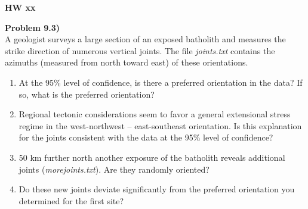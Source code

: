 \documentclass[10pt,letter]{report}
\renewcommand{\bf}{\textbf}
\begin{document}
	\begin{center} \bf{HW xx} \end{center}
		
	\bf{Problem 9.3)} \\

	A geologist surveys a large section of an exposed batholith and measures the strike 
	direction of numerous vertical joints.  The file \emph{joints.txt} contains the azimuths (measured from north toward east) 
	of these orientations.

	\begin{enumerate}[label=\alph*)]
	\item At the 95\% level of confidence, is there a preferred orientation in the data?  If so, what is the 
	preferred orientation?

	\item Regional tectonic considerations seem to favor a general extensional stress regime in the west-northwest
	-- east-southeast orientation.  Is this explanation for the joints consistent with the data 
	at the 95\% level of confidence?

	\item 50 km further north another exposure of the batholith reveals additional joints (\emph{morejoints.txt}).  Are 
	they randomly oriented?

	\item Do these new joints deviate significantly from the preferred orientation you determined for the first site?
	\end{enumerate}
\end{document}
